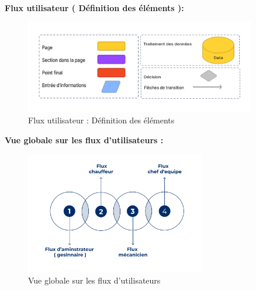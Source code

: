 \bigskip
\textbf{Flux utilisateur ( Définition des éléments ):}
\begin{figure}[htbp]
  \centering
  \includegraphics[width=0.9\textwidth]{chap2.images/user flow ( Définition des éléments ).png}
  \caption{Flux utilisateur : Définition des éléments}
\end{figure}


\bigskip
\textbf{Vue globale sur les flux d’utilisateurs :}
\begin{figure}[htbp]
  \centering
  \includegraphics[width=0.7\textwidth]{chap2.images/vue global user flow.png}
  \caption{Vue globale sur les flux d'utilisateurs}
\end{figure}




\newpage
